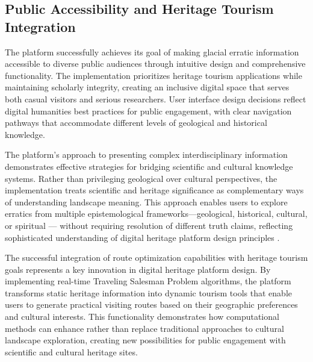 
\subsection{Public Accessibility and Heritage Tourism Integration}
\label{subsec:public_accessibility}

The platform successfully achieves its goal of making glacial erratic information accessible to diverse public audiences through intuitive design and comprehensive functionality. The implementation prioritizes heritage tourism applications while maintaining scholarly integrity, creating an inclusive digital space that serves both casual visitors and serious researchers. User interface design decisions reflect digital humanities best practices for public engagement, with clear navigation pathways that accommodate different levels of geological and historical knowledge.

The platform's approach to presenting complex interdisciplinary information demonstrates effective strategies for bridging scientific and cultural knowledge systems. Rather than privileging geological over cultural perspectives, the implementation treats scientific and heritage significance as complementary ways of understanding landscape meaning. This approach enables users to explore erratics from multiple epistemological frameworks—geological, historical, cultural, or spiritual — without requiring resolution of different truth claims, reflecting sophisticated understanding of digital heritage platform design principles \cite{Bodenhamer2010}.

The successful integration of route optimization capabilities with heritage tourism goals represents a key innovation in digital heritage platform design. By implementing real-time Traveling Salesman Problem algorithms, the platform transforms static heritage information into dynamic tourism tools that enable users to generate practical visiting routes based on their geographic preferences and cultural interests. This functionality demonstrates how computational methods can enhance rather than replace traditional approaches to cultural landscape exploration, creating new possibilities for public engagement with scientific and cultural heritage sites.

